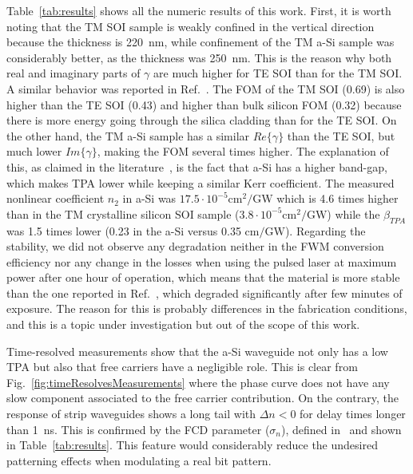 \documentclass[10pt,letterpaper]{article}
\begin{document}
Table~\ref{tab:results} shows all the numeric results of this work. First, it is worth noting that the TM SOI sample is weakly confined in the vertical direction because the thickness is 220~nm, while confinement of the TM a-Si sample was considerably better, as the thickness was 250~nm. This is the reason why both real and imaginary parts of $\gamma$ are much higher for TE SOI than for the TM SOI. A similar behavior was reported in Ref.~\cite{Vallaitis2009}. The FOM of the TM SOI (0.69) is also higher than the TE SOI (0.43) and higher than bulk silicon FOM (0.32) because there is more energy going through the silica cladding than for the TE SOI. On the other hand, the TM a-Si sample has a similar $Re\{\gamma\}$ than the TE SOI, but much lower $Im\{\gamma\}$, making the FOM several times higher. The explanation of this, as claimed in the literature~\cite{Narayanan2010, Kuyken2011}, is the fact that a-Si has a higher band-gap, which makes TPA lower while keeping a similar Kerr coefficient.
The measured nonlinear coefficient $n_2$ in a-Si was $17.5 \cdot 10^{-5}\mathrm{cm}^2 / \mathrm{GW}$ which is 4.6 times higher than in the TM crystalline silicon SOI sample ($3.8 \cdot 10^{-5}\mathrm{cm}^2 / \mathrm{GW}$) while the $\beta_{TPA} $ was 1.5 times lower (0.23 in the a-Si versus 0.35 $\mathrm{cm} / \mathrm{GW}$). Regarding the stability, we did not observe any degradation neither in the FWM conversion efficiency nor any change in the losses when using the pulsed laser at maximum power after one hour of operation, which means that the material is more stable than the one reported in Ref.~\cite{Kuyken2011}, which degraded significantly after few minutes of exposure. The reason for this is probably differences in the fabrication conditions, and this is a topic under investigation but out of the scope of this work.

Time-resolved measurements show that the a-Si waveguide not only has a low TPA but also that free carriers have a negligible role. This is clear from Fig.~\ref{fig:timeResolvesMeasurements} where the phase curve does not have any slow component associated to the free carrier contribution. On the contrary, the response of strip waveguides shows a long tail with $\Delta n <0$ for delay times longer than 1~ns. This is confirmed by the FCD parameter ($\sigma_n$), defined in~\cite{Lin2007} and shown in Table~\ref{tab:results}. This feature would considerably reduce the undesired patterning effects when modulating a real bit pattern.

\end{document}
